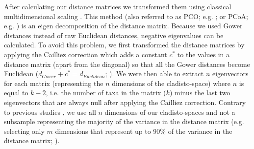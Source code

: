 \documentclass[12pt,letterpaper]{article}
\renewcommand{\subsubsection}[1]{%
\vspace{2ex}
\noindent
\textit{#1.}---}
\begin{document}
After calculating our distance matrices we transformed them using classical multidimensional scaling \citep[MDS;][]{torgerson1965multidimensional,GOWER01121966,cailliez1983analytical}.
This method (also referred to as PCO; e.g. \citealt{Brusatte2015}; or PCoA; e.g. \citealt{paradisape:2004}) is an eigen decomposition of the distance matrix.
Because we used Gower distances instead of raw Euclidean distances, negative eigenvalues can be calculated.
To avoid this problem, we first transformed the distance matrices by applying the Cailliez correction \citep{cailliez1983analytical} which adds a constant $c^*$ to the values in a distance matrix (apart from the diagonal) so that all the Gower distances become Euclidean ($d_{Gower}+c^*=d_{Euclidean}$; \citealt{cailliez1983analytical}). 
We were then able to extract $n$ eigenvectors for each matrix (representing the $n$ dimensions of the cladisto-space) where $n$ is equal to $k-2$, i.e. the number of taxa in the matrix ($k$) minus the last two eigenvectors that are always null after applying the Cailliez correction.
Contrary to previous studies \citep[e.g][]{brusatte50,cisneros2010,prentice2011,anderson2012using,Hughes20082013,bentonmodels2014}, we use all $n$ dimensions of our cladisto-spaces and not a subsample representing the majority of the variance in the distance matrix (e.g. selecting only $m$ dimensions that represent up to 90\% of the variance in the distance matrix; \citealt{Brusatte12092008,toljagictriassic-jurassic2013}).
\end{document}
